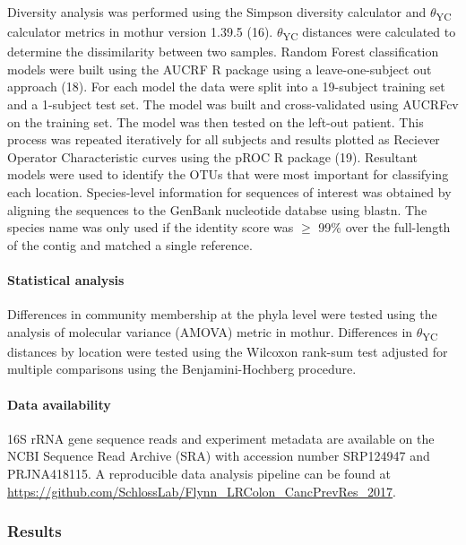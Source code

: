 \documentclass[12pt,]{article}
\let\oldparagraph\paragraph
\renewcommand{\paragraph}[1]{\oldparagraph{#1}\mbox{}}
\begin{document}
Diversity analysis was performed using the Simpson diversity calculator
and \(\theta\)\textsubscript{YC} calculator metrics in mothur version
1.39.5 (16). \(\theta\)\textsubscript{YC} distances were calculated to
determine the dissimilarity between two samples. Random Forest
classification models were built using the AUCRF R package using a
leave-one-subject out approach (18). For each model the data were split
into a 19-subject training set and a 1-subject test set. The model was
built and cross-validated using AUCRFcv on the training set. The model
was then tested on the left-out patient. This process was repeated
iteratively for all subjects and results plotted as Reciever Operator
Characteristic curves using the pROC R package (19). Resultant models
were used to identify the OTUs that were most important for classifying
each location. Species-level information for sequences of interest was
obtained by aligning the sequences to the GenBank nucleotide databse
using blastn. The species name was only used if the identity score was
\(\ge\) 99\% over the full-length of the contig and matched a single
reference.

\paragraph{Statistical analysis}\label{statistical-analysis}

Differences in community membership at the phyla level were tested using
the analysis of molecular variance (AMOVA) metric in mothur. Differences
in \(\theta\)\textsubscript{YC} distances by location were tested using
the Wilcoxon rank-sum test adjusted for multiple comparisons using the
Benjamini-Hochberg procedure.

\paragraph{Data availability}\label{data-availability}

16S rRNA gene sequence reads and experiment metadata are available on
the NCBI Sequence Read Archive (SRA) with accession number SRP124947 and
PRJNA418115. A reproducible data analysis pipeline can be found at
\url{https://github.com/SchlossLab/Flynn_LRColon_CancPrevRes_2017}.

\subsubsection{Results}\label{results}
\end{document}
